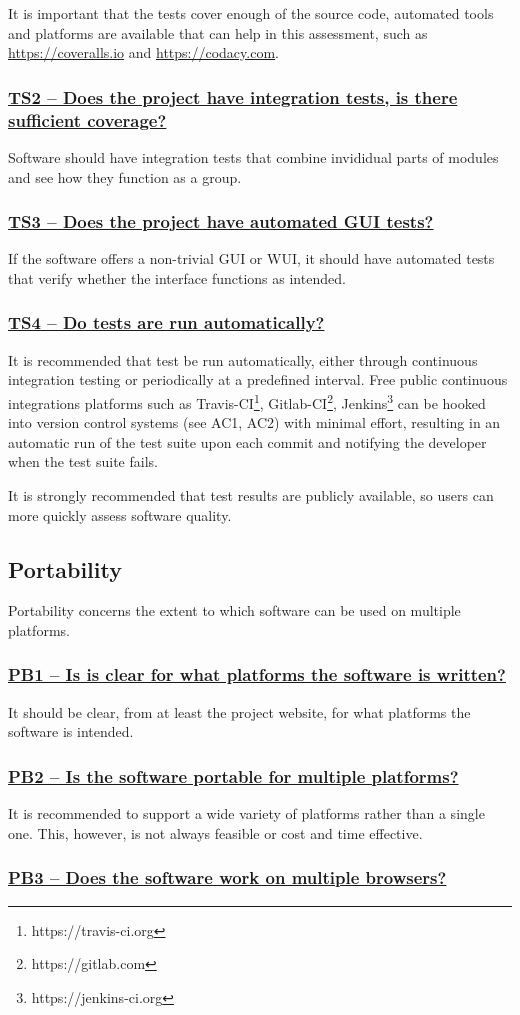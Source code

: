 \documentclass[a4paper,11pt]{article}
\newcommand{\indicator}[1]{\subsubsection*{\underline{#1}}}
\begin{document}
It is important that the tests cover enough of the source code, automated tools
and platforms are available that can help in this assessment, such as
\url{https://coveralls.io} and \url{https://codacy.com}.

\indicator{TS2 -- Does the project have integration tests, is there sufficient coverage?}

Software should have integration tests that combine invididual parts of modules and see how they function
as a group.

\indicator{TS3 -- Does the project have automated GUI tests?}

If the software offers a non-trivial GUI or WUI, it should have automated tests
that verify whether the interface functions as intended.

\indicator{TS4 -- Do tests are run automatically?}

It is recommended that test be run automatically, either through continuous
integration testing or periodically at a predefined interval. Free public
continuous integrations platforms such as
Travis-CI\footnote{https://travis-ci.org},
Gitlab-CI\footnote{https://gitlab.com},
Jenkins\footnote{https://jenkins-ci.org} can be hooked into version control
systems (see AC1, AC2) with minimal effort, resulting in an automatic run of the test suite
upon each commit and notifying the developer when the test suite fails.

It is strongly recommended that test results are publicly available, so users
can more quickly assess software quality.

\subsection{Portability}

Portability concerns the extent to which software can be used on multiple
platforms. 

\indicator{PB1 -- Is is clear for what platforms the software is written?}

It should be clear, from at least the project website, for what platforms the software
is intended.

\indicator{PB2 -- Is the software portable for multiple platforms?}

It is recommended to support a wide variety of platforms rather than a single
one. This, however, is not always feasible or cost and time effective.

\indicator{PB3 -- Does the software work on multiple browsers?}
\end{document}
